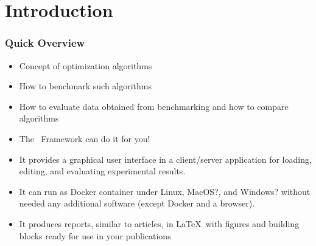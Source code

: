 %
\section{Introduction}%
%
\begin{frame}%
\frametitle{Quick Overview}%
\begin{itemize}%
\item Concept of optimization algorithms%
\item<2-> How to benchmark such algorithms%
\item<3-> How to evaluate data obtained from benchmarking and how to compare algorithms
\item<4-> The \optimizationBenchmarking\ Framework can do it for you!%
\item<7-> It provides a graphical user interface in a client/server application for loading, editing, and evaluating experimental results.%
\item<8-> It can run as Docker container under Linux, MacOS?, and Windows? without needed any additional software (except Docker and a browser).%
\item<9-> It produces reports, similar to articles, in \LaTeX\ with figures and building blocks ready for use in your publications%
\end{itemize}%
\end{frame}%
%
%
